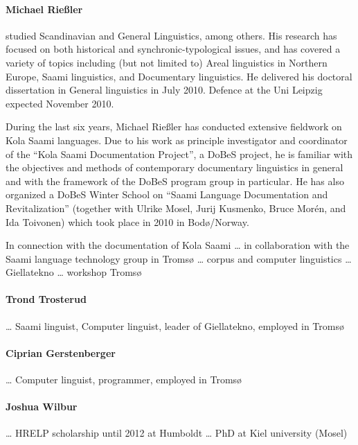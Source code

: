 \documentclass[a4paper,12pt]{article}
\begin{document}
\paragraph{Michael Rießler} studied Scandinavian and General Linguistics, among others. His research has focused on both historical and synchronic-typological issues, and has covered a variety of topics including (but not limited to) Areal linguistics in Northern Europe, Saami linguistics, and Documentary linguistics. He delivered his doctoral dissertation in General linguistics in July 2010. Defence at the Uni Leipzig expected November 2010.

During the last six years, Michael Rießler has conducted extensive fieldwork on Kola Saami languages. Due to his work as principle investigator and coordinator of the “Kola Saami Documentation Project”, a DoBeS project, he is familiar with the objectives and methods of contemporary documentary linguistics in general and with the framework of the DoBeS program group in particular. He has also organized a DoBeS Winter School on “Saami Language Documentation and Revitalization” (together with Ulrike Mosel, Jurij Kusmenko, Bruce Morén, and Ida Toivonen) which took place in 2010 in Bodø/Norway.

In connection with the documentation of Kola Saami … in collaboration with the Saami language technology group in Tromsø … corpus and computer linguistics … Giellatekno … workshop Tromsø

\paragraph{Trond Trosterud} … Saami linguist, Computer linguist, leader of Giellatekno, employed in Tromsø

\paragraph{Ciprian Gerstenberger} … Computer linguist, programmer, employed in Tromsø

\paragraph{Joshua Wilbur} … HRELP scholarship until 2012 at Humboldt … PhD at Kiel university (Mosel)
\end{document}
